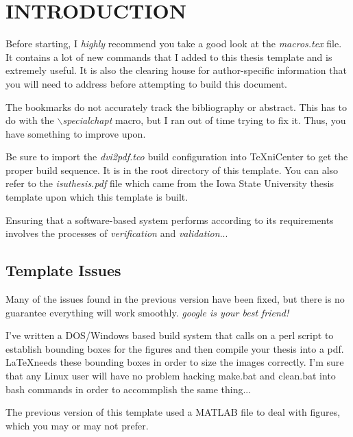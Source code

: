 
\chapter{INTRODUCTION}\label{ch:intro}

Before starting, I \emph{highly} recommend you take a good look at the \emph{macros.tex} file.  It contains a lot of new commands that I added to this thesis template and is extremely useful.  It is also the clearing house for author-specific information that you will need to address before attempting to build this document.

The bookmarks do not accurately track the bibliography or abstract.  This has to do with the \textit{$\backslash$specialchapt} macro, but I ran out of time trying to fix it.  Thus, you have something to improve upon.
 
Be sure to import the \emph{dvi2pdf.tco} build configuration into TeXniCenter to get the proper build sequence.  It is in the root directory of this template.  You can also refer to the \emph{isuthesis.pdf} file which came from the Iowa State University thesis template upon which this template is built.

Ensuring that a software-based system performs according to its requirements involves the processes of \emph{verification} and \emph{validation}...

\section{Template Issues}\label{sec:issues}
  
  Many of the issues found in the previous version have been fixed, but there is no guarantee everything will work smoothly.
  \emph{google is your best friend!}

  I've written a DOS/Windows based build system that calls on a perl script to establish bounding boxes for the figures and then compile your thesis into a pdf.
  \LaTeX needs these bounding boxes in order to size the images correctly.
  I'm sure that any Linux user will have no problem hacking make.bat and clean.bat into bash commands in order to accommplish the same thing...

  The previous version of this template used a MATLAB file to deal with figures, which you may or may not prefer.

